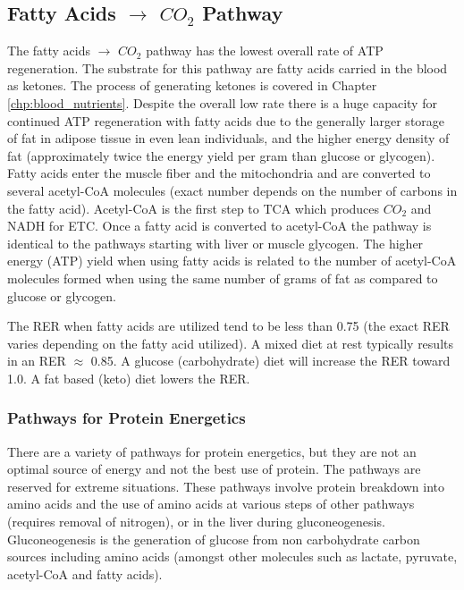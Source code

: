 \subsection{Fatty Acids $\rightarrow$ $CO_2$ Pathway}

The fatty acids $\rightarrow$ $CO_2$ pathway has the lowest overall rate of ATP regeneration. The substrate for this pathway are fatty acids carried in the blood as ketones. The process of generating ketones is covered in Chapter \ref{chp:blood_nutrients}. Despite the overall low rate there is a huge capacity for continued ATP regeneration with fatty acids due to the generally larger storage of fat in adipose tissue in even lean individuals, and the higher energy density of fat (approximately twice the energy yield per gram than glucose or glycogen). Fatty acids enter the muscle fiber and the mitochondria and are converted to several acetyl-CoA molecules (exact number depends on the number of carbons in the fatty acid). Acetyl-CoA is the first step to TCA which produces $CO_2$ and NADH for ETC. Once a fatty acid is converted to acetyl-CoA the pathway is identical to the pathways starting with liver or muscle glycogen. The higher energy (ATP) yield when using fatty acids is related to the number of acetyl-CoA molecules formed when using the same number of grams of fat as compared to glucose or glycogen. 

The RER when fatty acids are utilized tend to be less than 0.75 (the exact RER varies depending on the fatty acid utilized). A mixed diet at rest typically results in an RER $\approx$ 0.85. A glucose (carbohydrate) diet will increase the RER toward 1.0. A fat based (keto) diet lowers the RER.

\subsubsection{Pathways for Protein Energetics}

There are a variety of pathways for protein energetics, but they are not an optimal source of energy and not the best use of protein. The pathways are reserved for extreme situations. These pathways involve protein breakdown into amino acids and the use of amino acids at various steps of other pathways (requires removal of nitrogen), or in the liver during gluconeogenesis. Gluconeogenesis is the generation of glucose from non carbohydrate carbon sources including amino acids (amongst other molecules such as lactate, pyruvate, acetyl-CoA and fatty acids).


